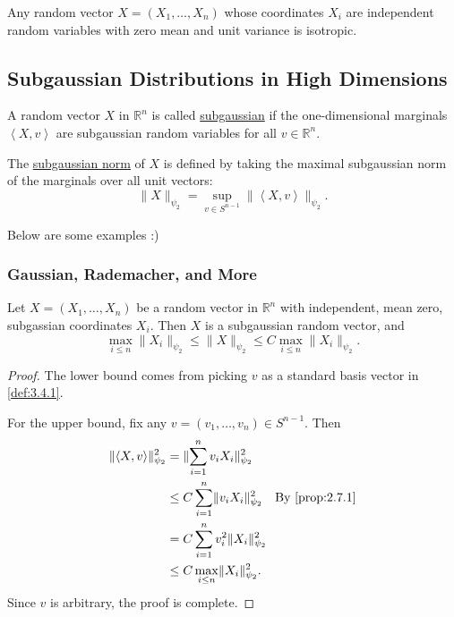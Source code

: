 \begin{example}
\label{ex:3.3.15}
Any random vector $X = (X_1, \dots, X_n)$ whose coordinates $X_i$ are independent random variables with zero 
mean and unit variance is isotropic. 
\end{example}



\subsection{Subgaussian Distributions in High Dimensions}
\begin{definition}[]
\label{def:3.4.1}
A random vector $X$ in $\mathbb{R}^n$ is called \underline{subgaussian} if the one-dimensional marginals 
$\left\langle X, v \right\rangle$ are subgaussian random variables for all $v \in \mathbb{R}^n$. 

The \underline{subgaussian norm} of $X$ is defined by taking the maximal subgaussian norm of the marginals 
over all unit vectors: 
\[ \lVert X \rVert_{\psi_2} = \sup_{v \in S^{n - 1}} \lVert \left\langle X, v \right\rangle \rVert_{\psi_2}. \]
\end{definition}

Below are some examples :)

\subsubsection{Gaussian, Rademacher, and More}
\begin{lemma}
\label{lem:3.4.2}
Let $X = (X_1, \dots, X_n)$ be a random vector in $\mathbb{R}^n$ with independent, mean zero, subgassian 
coordinates $X_i$. Then $X$ is a subgaussian random vector, and 
\[ \max_{i \leq n} \lVert X_i \rVert_{\psi_2} \leq \lVert X \rVert_{\psi_2} 
\leq C \max_{i \leq n} \lVert X_i \rVert_{\psi_2}. \]
\end{lemma}

\begin{proof}
The lower bound comes from picking $v$ as a standard basis vector in \cref{def:3.4.1}. 

For the upper bound, fix any $v = (v_1, \dots, v_n) \in S^{n - 1}$. Then 
\begin{align*}
	\lVert \left\langle X, v \right\rangle \rVert_{\psi_2}^2 
	&= \lVert \sum_{i = 1}^{n} v_i X_i \rVert_{\psi_2}^2 \\ 
	&\leq C \sum_{i = 1}^{n} \lVert v_i X_i \rVert_{\psi_2}^2 \quad \text{By \cref{prop:2.7.1}} \\
	&= C \sum_{i = 1}^{n} v_i^2 \lVert X_i \rVert_{\psi_2}^2 \\
	&\leq C \max_{i \leq n} \lVert X_i \rVert_{\psi_2}^2.
\end{align*}
Since $v$ is arbitrary, the proof is complete.
\end{proof}

